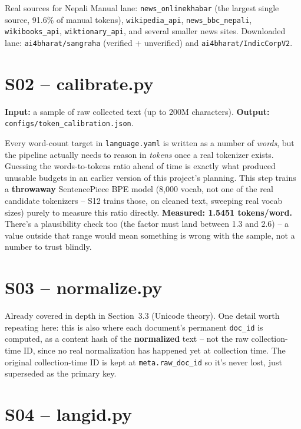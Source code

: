 \documentclass[11pt]{report}
\begin{document}
\begin{implementation}{Real sources for Nepali}
Manual lane: \texttt{news\_onlinekhabar} (the largest single source, 91.6\%
of manual tokens), \texttt{wikipedia\_api}, \texttt{news\_bbc\_nepali},
\texttt{wikibooks\_api}, \texttt{wiktionary\_api}, and several smaller news
sites. Downloaded lane: \texttt{ai4bharat/sangraha} (verified +
unverified) and \texttt{ai4bharat/IndicCorpV2}.
\end{implementation}

\section{S02 -- calibrate.py}

\textbf{Input:} a sample of raw collected text (up to 200M characters).
\textbf{Output:} \texttt{configs/token\_calibration.json}.

Every word-count target in \texttt{language.yaml} is written as a number
of \textit{words}, but the pipeline actually needs to reason in
\textit{tokens} once a real tokenizer exists. Guessing the words-to-tokens
ratio ahead of time is exactly what produced unusable budgets in an
earlier version of this project's planning. This step trains a
\textbf{throwaway} SentencePiece BPE model (8,000 vocab, not one of the
real candidate tokenizers -- S12 trains those, on cleaned text, sweeping
real vocab sizes) purely to measure this ratio directly.
\textbf{Measured: 1.5451 tokens/word.} There's a plausibility check too
(the factor must land between 1.3 and 2.6) -- a value outside that range
would mean something is wrong with the sample, not a number to trust
blindly.

\section{S03 -- normalize.py}

Already covered in depth in Section~3.3 (Unicode theory). One detail
worth repeating here: this is also where each document's permanent
\texttt{doc\_id} is computed, as a content hash of the \textbf{normalized}
text -- not the raw collection-time ID, since no real normalization has
happened yet at collection time. The original collection-time ID is kept
at \texttt{meta.raw\_doc\_id} so it's never lost, just superseded as the
primary key.

\section{S04 -- langid.py}
\end{document}
